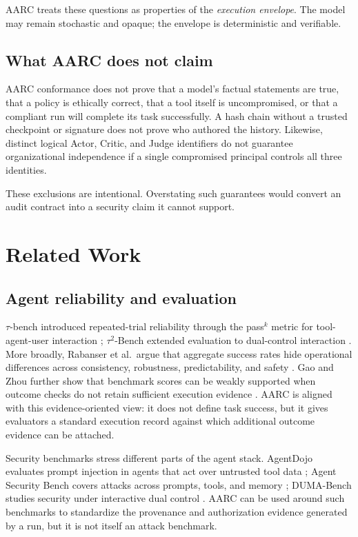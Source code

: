 \documentclass{article}
\begin{document}
AARC treats these questions as properties of the \emph{execution envelope}.
The model may remain stochastic and opaque; the envelope is deterministic and
verifiable.

\subsection{What AARC does not claim}

AARC conformance does not prove that a model's factual statements are true,
that a policy is ethically correct, that a tool itself is uncompromised, or that
a compliant run will complete its task successfully. A hash chain without a
trusted checkpoint or signature does not prove who authored the history.
Likewise, distinct logical Actor, Critic, and Judge identifiers do not guarantee
organizational independence if a single compromised principal controls all
three identities.

These exclusions are intentional. Overstating such guarantees would convert an
audit contract into a security claim it cannot support.

\section{Related Work}

\subsection{Agent reliability and evaluation}

$\tau$-bench introduced repeated-trial reliability through the pass$^k$ metric
for tool-agent-user interaction \cite{yao2024taubench}; $\tau^2$-Bench extended
evaluation to dual-control interaction \cite{barres2025tau2}. More broadly,
Rabanser et al.\ argue that aggregate success rates hide operational differences
across consistency, robustness, predictability, and safety
\cite{rabanser2026reliability}. Gao and Zhou further show that benchmark scores
can be weakly supported when outcome checks do not retain sufficient execution
evidence \cite{gao2026evidence}. AARC is aligned with this evidence-oriented
view: it does not define task success, but it gives evaluators a standard
execution record against which additional outcome evidence can be attached.

Security benchmarks stress different parts of the agent stack. AgentDojo
evaluates prompt injection in agents that act over untrusted tool data
\cite{debenedetti2024agentdojo}; Agent Security Bench covers attacks across
prompts, tools, and memory \cite{zhang2025asb}; DUMA-Bench studies security under
interactive dual control \cite{aleksandrov2026duma}. AARC can be used around
such benchmarks to standardize the provenance and authorization evidence
generated by a run, but it is not itself an attack benchmark.
\end{document}
